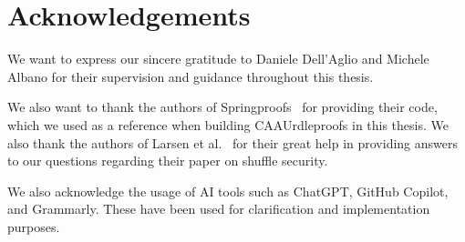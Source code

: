 

\section{Acknowledgements}\label{sec:acknowledgements}
We want to express our sincere gratitude to Daniele Dell'Aglio and Michele Albano for their supervision and guidance throughout this thesis.

We also want to thank the authors of Springproofs~\cite{zhang2024springproofs} for providing their code, which we used as a reference when building CAAUrdleproofs in this thesis.
We also thank the authors of Larsen et al.~\cite{cryptoeprint:2022/560} for their great help in providing answers to our questions regarding their paper on shuffle security.

We also acknowledge the usage of AI tools such as ChatGPT, GitHub Copilot, and Grammarly.
These have been used for clarification and implementation purposes.